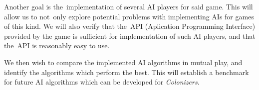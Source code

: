 Another goal is the~implementation of several AI players for said game. This will
allow us to not~only explore potential problems with implementing AIs for games
of this kind. We will also verify that the~API (Aplication Programming Interface)
provided by the game is sufficient for implementation of such AI players, and that
the~API is reasonably easy to use.

We then wish to compare the implemented AI algorithms in mutual play,
and identify the algorithms which perform the best. This will establish a benchmark
for future AI algorithms which can be developed for \emph{Colonizers}.
